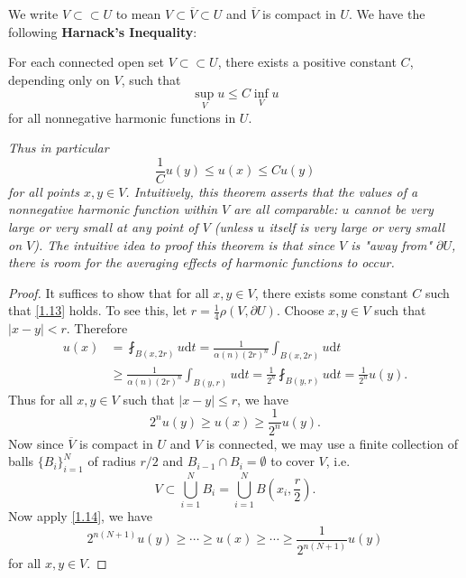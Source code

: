 We write $V\subset\subset U$ to mean $V\subset\overline{V}\subset U$ and $\overline{V}$ is compact in $U$. We have the following \textbf{Harnack's Inequality}: 
\begin{theorem}
For each connected open set $V\subset\subset U$, there exists a positive constant $C$, depending only on $V$, such that 
$$
\mathop {\mathrm{sup}} \limits_{V}u\le C\mathop {\mathrm{inf}} \limits_{V}u
$$
for all nonnegative harmonic functions in $U$.
\end{theorem}
\begin{note}\em
Thus in particular 
\begin{equation}\label{1.13}
\frac{1}{C}u\left( y \right) \le u\left( x \right) \le Cu\left( y \right) 
\end{equation}
for all points $x,y\in V$. Intuitively, this theorem asserts that the values of a nonnegative harmonic function within $V$ are all comparable: $u$ cannot be very large or very small at any point of $V$ (unless $u$ itself is very large or very small on $V$). The intuitive idea to proof this theorem is that since $V$ is "away from" $\partial U$, there is room for the averaging effects of harmonic functions to occur.
\end{note}
\begin{proof}
It suffices to show that for all $x,y\in V$, there exists some constant $C$ such that \eqref{1.13} holds. To see this, let $r=\frac{1}{4}\rho(V,\partial U)$. Choose $x,y\in V$ such that $|x-y|<r$. Therefore 
$$
\begin{aligned}
u\left( x \right) &=\fint_{B\left( x,2r \right)}{u\mathrm{d}t}=\frac{1}{\alpha \left( n \right) \left( 2r \right) ^n}\int_{B\left( x,2r \right)}{u\mathrm{d}t}
\\
&\ge \frac{1}{\alpha \left( n \right) \left( 2r \right) ^n}\int_{B\left( y,r \right)}{u\mathrm{d}t}=\frac{1}{2^n}\fint_{B\left( y,r \right)}{u\mathrm{d}t}=\frac{1}{2^n}u\left( y \right) .
\end{aligned}
$$
Thus for all $x,y\in V$ such that $|x-y|\le r$, we have 
\begin{equation}\label{1.14}
2^nu\left( y \right) \ge u\left( x \right) \ge \frac{1}{2^n}u\left( y \right) .
\end{equation}
Now since $\overline{V}$ is compact in $U$ and $V$ is connected, we may use a finite collection of balls $\{B_i\}_{i=1}^N$ of radius $r/2$ and $B_{i-1}\cap B_i=\emptyset$ to cover $V$, i.e. 
$$
V\subset \bigcup_{i=1}^N{B_i}=\bigcup_{i=1}^N{B\left( x_i,\frac{r}{2} \right)}.
$$
Now apply \eqref{1.14}, we have 
$$
2^{n\left( N+1 \right)}u\left( y \right) \ge \cdots \ge u\left( x \right) \ge \cdots \ge \frac{1}{2^{n\left( N+1 \right)}}u\left( y \right) 
$$
for all $x,y\in V$.
\end{proof}
